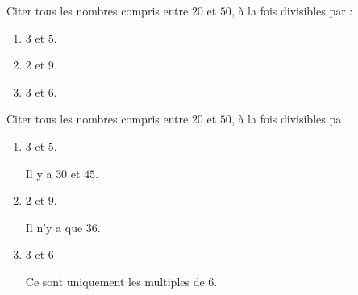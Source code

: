 \begin{exercice*}
Citer tous les nombres compris entre $20$ et $50$, à la fois divisibles par :  
    \begin{enumerate}
        \item $3$ et $5$.
        \item $2$ et $9$.
        \item $3$ et $6$.
    \end{enumerate}
\end{exercice*}
\begin{corrige}
  Citer tous les nombres compris entre $20$ et $50$, à la fois divisibles pa
    \begin{enumerate}
        \item $3$ et $5$.
        
        Il y a $30$ et $45$.
        \item $2$ et $9$.
        
          Il n'y a que $36$.
        \item $3$ et $6$

          Ce sont uniquement les multiples de $6$.
    \end{enumerate}
\end{corrige}

